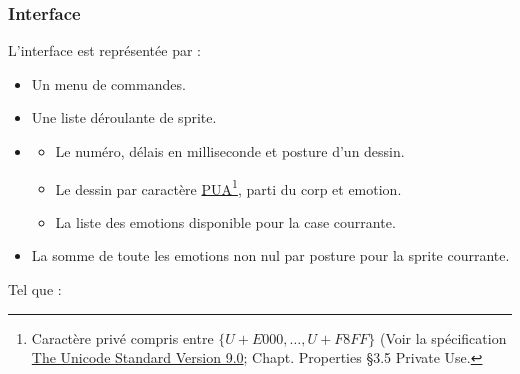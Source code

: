 \documentclass{report}
\begin{document}
\subsubsection{Interface}

L'interface est représentée par :

\begin{itemize}
	\item Un menu de commandes.
	\item Une liste déroulante de sprite.
    \item {
		\begin{itemize}
			\item Le numéro, délais en milliseconde et posture d'un dessin.
			\item Le dessin par caractère \textendash\href{https://en.wikipedia.org/wiki/Private_Use_Areas}{PUA}\footnote{ Caractère privé compris entre $\{U+E000, \ldots{}, U+F8FF\}$ (Voir la spécification \href{http://www.unicode.org/versions/Unicode9.0.0/ch03.pdf}{The Unicode Standard Version 9.0}; Chapt. Properties \S{3.5} \textendash{} Private Use. }\textendash{}, parti du corp et emotion.
			\item La liste des emotions disponible pour la case courrante.
		\end{itemize}
    }
    \item La somme de toute les emotions non nul par posture pour la sprite courrante.
\end{itemize}

Tel que :
\end{document}
